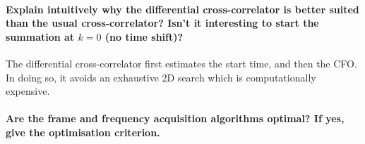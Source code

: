 \paragraph{Explain intuitively why the differential cross-correlator is better suited than the usual cross-correlator? Isn’t it interesting to start the summation at $k = 0$ (no time shift)?}
The differential cross-correlator first estimates the start time, and then the CFO. In doing so, it avoids an exhaustive 2D search which is computationally expensive.

\paragraph{Are the frame and frequency acquisition algorithms optimal? If yes, give the optimisation criterion.}
